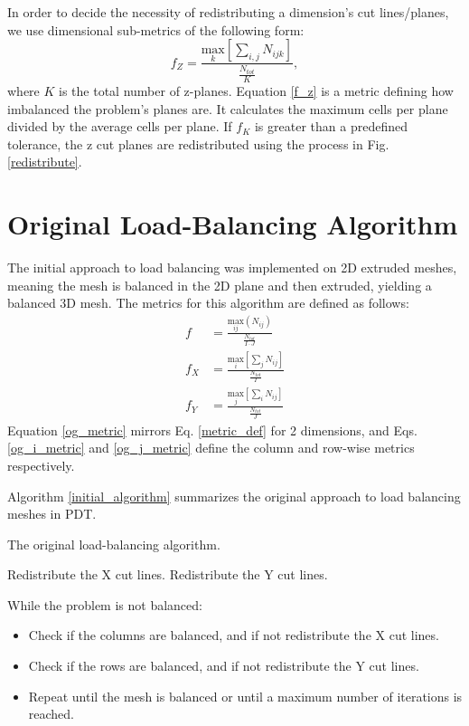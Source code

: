 In order to decide the necessity of redistributing a dimension's cut lines/planes, we use dimensional sub-metrics of the following form:
\begin{equation}
f_{Z} = \frac{\underset{k}{\text{max}}[\sum_{i,j} N_{ijk}]}{\frac{N_{tot}}{K}},
\label{f_z}
\end{equation}
where $K$ is the total number of z-planes. 
Equation \ref{f_z} is a metric defining how imbalanced the problem's planes are. It calculates the maximum cells per plane divided by the average cells per plane. If $f_K$ is greater than a predefined tolerance, the z cut planes are redistributed using the process in Fig. \ref{redistribute}. 
 
\section{Original Load-Balancing Algorithm}
\label{sec:og_lb}

The initial approach to load balancing was implemented on 2D extruded meshes, meaning the mesh is balanced in the 2D plane and then extruded, yielding a balanced 3D mesh. The metrics for this algorithm are defined as follows:
\begin{align}
f &= \frac{\underset{ij}{\text{max}}(N_{ij})}{\frac{N_{tot}}{I\cdot J}}  \label{og_metric}\\
f_X &= \frac{\underset{i}{\text{max}}[\sum_{j} N_{ij}] } {\frac{N_{tot}}{I}} \label{og_i_metric} \\
f_Y &= \frac{\underset{j}{\text{max}}[\sum_{i} N_{ij}] } {\frac{N_{tot}}{J}} \label{og_j_metric}
\end{align}
Equation \ref{og_metric} mirrors Eq. \ref{metric_def} for 2 dimensions, and Eqs. \ref{og_i_metric} and \ref{og_j_metric} define the column and row-wise metrics respectively. 

 Algorithm \ref{initial_algorithm} summarizes the original approach to load balancing meshes in PDT.
\begin{algorithm}[H]
\caption{The original load-balancing algorithm.}
\label{initial_algorithm}
\begin{algorithmic}

    \STATE Redistribute the X cut lines.
  \ENDIF
  	\STATE Redistribute the Y cut lines.
  \ENDIF
\ENDWHILE
\end{algorithmic}
\end{algorithm}
While the problem is not balanced:
\begin{itemize}
  \item Check if the columns are balanced, and if not redistribute the X cut lines.
  \item Check if the rows are balanced, and if not redistribute the Y cut lines.
  \item Repeat until the mesh is balanced or until a maximum number of iterations is reached.
\end{itemize}

